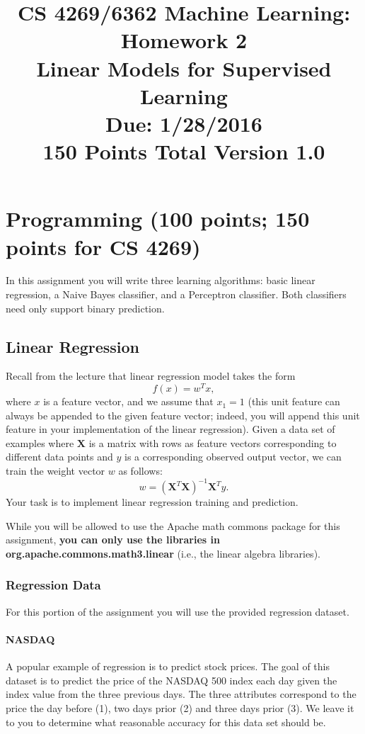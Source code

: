 \documentclass[11pt]{article}
\title{CS 4269/6362 Machine Learning: Homework 2\\Linear Models for Supervised Learning\\
\Large{Due: 1/28/2016}\\
150 Points Total \hspace{1cm} Version 1.0}
\author{}
\date{}
\begin{document}
\large
\maketitle
\thispagestyle{headings}

\vspace{-.5in}
\section{Programming (100 points; 150 points for CS 4269)}
In this assignment you will write three learning algorithms: basic linear
regression, a Naive Bayes classifier, and a Perceptron classifier. Both classifiers need only support binary prediction.

\subsection{Linear Regression}

Recall from the lecture that linear regression model takes the form
\[
f(x) = w^T x,
\]
where $x$ is a feature vector, and we assume that $x_1 = 1$ (this unit
feature can always be appended to the given feature vector; indeed,
you will append this unit feature in your implementation of the linear
regression).
Given a data set of examples where $\mathbf{X}$ is a matrix with rows
as feature vectors corresponding to different data points and
$y$ is a corresponding observed output vector, we can train
the weight vector $w$ as follows:
\[
w = (\mathbf{X}^T \mathbf{X})^{-1} \mathbf{X}^T y.
\]
Your task is to implement linear regression training and prediction.

While you will be allowed to use the Apache math commons package for
this assignment, {\bf you can only use the libraries in
  org.apache.commons.math3.linear} (i.e., the linear algebra libraries).

\subsubsection{Regression Data}
For this portion of the assignment you will use the provided regression dataset.

\paragraph{{\bf NASDAQ}} A popular example of regression is to predict stock prices. The goal of this dataset is to predict the price of the NASDAQ 500 index each day given the index value from the three previous days. The three attributes correspond to the price the day before (1), two days prior (2) and three days prior (3). We leave it to you to determine what reasonable accuracy for this data set should be.
\end{document}
